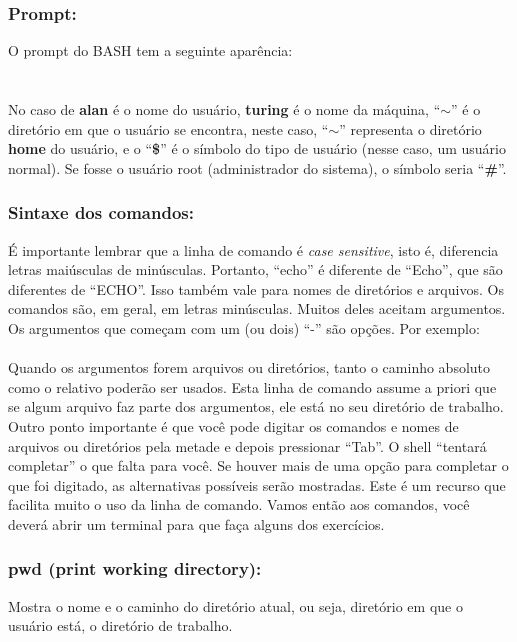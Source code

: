 \begin{refsection}
\subsubsection{Prompt:}\label{tut1:text_modeommands:prompt}
O prompt do BASH tem a seguinte aparência:\\
\indent\indent\userprompt{ }\\
\\
 No caso de \userprompt{ } \textbf{alan} é o nome do usuário, \textbf{turing} é o nome da máquina, ``\textbf{$\sim$}'' é o diretório em que o usuário se encontra, neste caso, ``\textbf{$\sim$}'' representa o diretório \textbf{home} do usuário, e o ``\textbf{\$}'' é o símbolo do tipo de usuário (nesse caso, um usuário normal). Se fosse o usuário root (administrador do sistema), o símbolo seria ``\textbf{\#}''.\\

\subsubsection{Sintaxe dos comandos:}\label{tut1:text_mode:commands:syntax}
É importante lembrar que a linha de comando é \textit{case sensitive}, isto é, diferencia letras maiúsculas de minúsculas. Portanto, ``echo'' é diferente de ``Echo'', que são diferentes de ``ECHO''. Isso também vale para nomes de diretórios e arquivos. Os comandos são, em geral, em letras minúsculas. Muitos deles aceitam argumentos. Os argumentos que começam com um (ou dois) ``-'' são opções. Por exemplo:\\

\\

 Quando os argumentos forem arquivos ou diretórios, tanto o caminho absoluto como o relativo poderão ser usados. Esta linha de comando assume a priori que se algum arquivo faz parte dos argumentos, ele está no seu diretório de trabalho.\\
Outro ponto importante é que você pode digitar os comandos e nomes de arquivos ou diretórios pela metade e depois pressionar ``Tab''. O shell ``tentará completar'' o que falta para você. Se houver mais de uma opção para completar o que foi digitado, as alternativas possíveis serão mostradas. Este é um recurso que facilita muito o uso da linha de comando. Vamos então aos comandos, você deverá abrir um terminal para que faça alguns dos exercícios.\\

\subsubsection{pwd (print working directory):}\label{tut1:text_mode:commands:pwd}
 Mostra o nome e o caminho do diretório atual, ou seja, diretório em que o usuário está, o diretório de trabalho.\\


\end{refsection}
